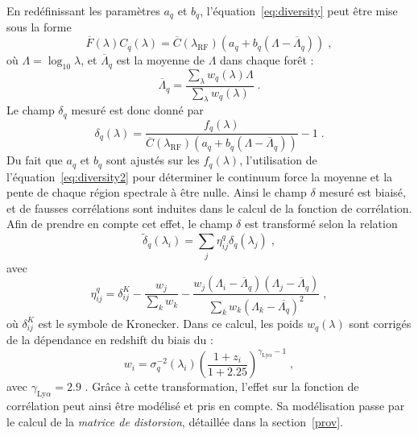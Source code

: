 \documentclass[11pt, twoside, a4paper, openright]{report}
\begin{document}
En redéfinissant les paramètres $a_q$ et $b_q$, l'équation~\ref{eq:diversity} peut être mise sous la forme
\begin{equation}
  \label{eq:diversity2}
  \overline F(\lambda) C_q(\lambda) = \overline C(\lambda_{\mathrm{RF}})(a_q + b_q (\Lambda - \overline \Lambda_q))  \; ,
\end{equation}
où $\Lambda = \log_{10} \lambda$, et $\overline \Lambda_q$ est la moyenne de $\Lambda$ dans chaque forêt :
\begin{equation}
  \label{eq:lambda_mean}
  \overline \Lambda_q = \frac{\sum\limits_{\lambda} w_q(\lambda) \Lambda}{\sum\limits_{\lambda} w_q(\lambda)}  \; .
\end{equation}
Le champ $ \delta_q$ mesuré est donc donné par
\begin{equation}
  \label{eq:deltaF2}
   \delta_q(\lambda) = \frac{f_q(\lambda)}{\overline C(\lambda_{\mathrm{RF}})(a_q + b_q (\Lambda - \overline \Lambda_q))} - 1  \; .
\end{equation}
Du fait que $a_q$ et $b_q$ sont ajustés sur les $f_q(\lambda)$, l'utilisation de l'équation~\ref{eq:diversity2} pour déterminer le continuum force la moyenne et la pente de chaque région spectrale à être nulle. Ainsi le champ $\delta$ mesuré est biaisé, et de fausses corrélations sont induites dans le calcul de la fonction de corrélation.
Afin de prendre en compte cet effet, le champ $\delta$ est transformé selon la relation
\begin{equation}
  \label{eq:deltaF3}
  \tilde \delta_q(\lambda_i) = \sum\limits_j \eta_{ij}^q \delta_q(\lambda_j)  \; ,
\end{equation}
avec
\begin{equation}
  \eta^q_{ij}
  =
  \delta^K_{ij}
  - \frac{
    w_{j}
  }{
    \sum\limits_{k} w_{k}
  }
  -
  \frac{
    w_{j} \left( \Lambda_{i}-\overline \Lambda_{q} \right) \left(\Lambda_j-\overline \Lambda_{q} \right)
  }{
    \sum\limits_{k} w_{k} \left( \Lambda_{k}-\overline {\Lambda_{q}} \right)^{2}
  }
  \; ,
  \label{eq::proj1}
\end{equation}
où $\delta^K_{ij}$ est le symbole de Kronecker.
Dans ce calcul, les poids $w_q(\lambda)$ sont corrigés de la dépendance en redshift du biais du \lya{} :
\begin{equation}
  \label{eq:weights2}
  w_{i}
  =
  \sigma_q^{-2}(\lambda_i)
  \left( \frac{1+z_{i}}{1+2.25} \right)^{\gamma_{\mathrm{Ly}\alpha} -1} \;,
\end{equation}
avec $\gamma_{\mathrm{Ly}\alpha} = 2.9$ \citep{mcdonald_ly_2006}.
Grâce à cette transformation, l'effet sur la fonction de corrélation peut ainsi être modélisé et pris en compte. Sa modélisation passe par le calcul de la \emph{matrice de distorsion}, détaillée dans la section~\ref{prov}.
\end{document}
